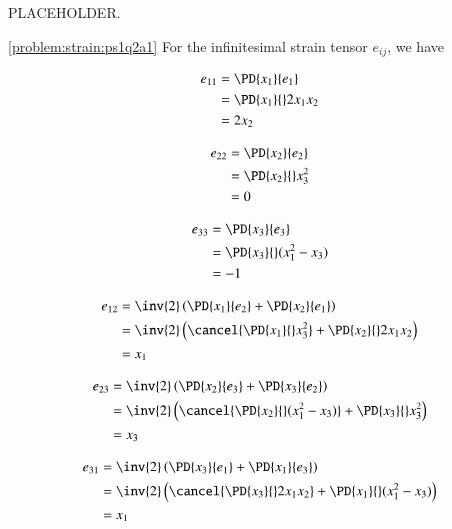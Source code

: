 \begin{Exercise}[
title={Derive the 3D compatibility conditions},
label={problem:strainFIXME:todo3d}
]

PLACEHOLDER.

\end{Exercise}

\begin{Answer}[ref={problem:strain:ps1q2a}]

\ref{problem:strain:ps1q2a1} For the infinitesimal strain tensor $e_{ij}$, we have

\begin{align*}
e_{11}
&= \PD{x_1}{e_1} \\
&= \PD{x_1}{}2 x_1 x_2 \\
&= 2 x_2
\end{align*}

\begin{align*}
e_{22}
&= \PD{x_2}{e_2} \\
&= \PD{x_2}{} x_3^2 \\
&= 0
\end{align*}

\begin{align*}
e_{33}
&= \PD{x_3}{e_3} \\
&= \PD{x_3}{} ( x_1^2 - x_3 ) \\
&= -1
\end{align*}

\begin{align*}
e_{12}
&=
\inv{2} \left(
\PD{x_1}{e_2}
+
\PD{x_2}{e_1}
\right) \\
&=
\inv{2}
\left(
\cancel{\PD{x_1}{} x_3^2 }
+
\PD{x_2}{} 2 x_1 x_2
\right) \\
&=
x_1
\end{align*}

\begin{align*}
e_{23}
&=
\inv{2} \left(
\PD{x_2}{e_3}
+
\PD{x_3}{e_2}
\right) \\
&=
\inv{2}
\left(
\cancel{\PD{x_2}{} (x_1^2 - x_3 )}
+
\PD{x_3}{} x_3^2
\right) \\
&=
x_3
\end{align*}

\begin{align*}
e_{31}
&=
\inv{2} \left(
\PD{x_3}{e_1}
+
\PD{x_1}{e_3}
\right) \\
&=
\inv{2}
\left(
\cancel{\PD{x_3}{} 2 x_1 x_2 }
+
\PD{x_1}{} (x_1^2 - x_3 )
\right) \\
&=
x_1
\end{align*}


\end{Answer}
